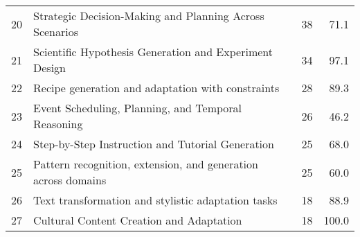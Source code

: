 \begin{table}[h!]
{\begin{tabular}{r l r r}
20 & Strategic Decision-Making and Planning Across Scenarios & 38 & 71.1 \\
21 & Scientific Hypothesis Generation and Experiment Design & 34 & 97.1 \\
22 & Recipe generation and adaptation with constraints & 28 & 89.3 \\
23 & Event Scheduling, Planning, and Temporal Reasoning & 26 & 46.2 \\
24 & Step-by-Step Instruction and Tutorial Generation & 25 & 68.0 \\
25 & Pattern recognition, extension, and generation across domains & 25 & 60.0 \\
26 & Text transformation and stylistic adaptation tasks & 18 & 88.9 \\
27 & Cultural Content Creation and Adaptation & 18 & 100.0 \\
\bottomrule
\end{tabular}}
\end{table}

